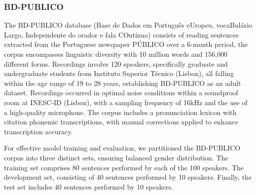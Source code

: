 \subsubsection*{BD-PUBLICO}
The BD-PUBLICO database (Base de Dados em Português eUropeu, vocaBulário Largo, Independente do orador e fala COntínua) \cite{bdpublico} consists of reading sentences extracted from the Portuguese newspaper PÚBLICO over a 6-month period, the corpus encompasses linguistic diversity with 10 million words and 156,000 different forms. Recordings involve 120 speakers, specifically graduate and undergraduate students from Instituto Superior Técnico (Lisbon), all falling within the age range of 19 to 28 years, establishing BD-PUBLICO as an adult dataset. Recordings occurred in optimal noise conditions within a soundproof room at INESC-ID (Lisbon), with a sampling frequency of 16kHz and the use of a high-quality microphone. The corpus includes a pronunciation lexicon with citation phonemic transcriptions, with manual corrections applied to enhance transcription accuracy.

For effective model training and evaluation, we partitioned the BD-PUBLICO corpus into three distinct sets, ensuring balanced gender distribution. The training set comprises 80 sentences performed by each of the 100 speakers. The development set, consisting of 40 sentences performed by 10 speakers. Finally, the test set includes 40 sentences performed by 10 speakers.




